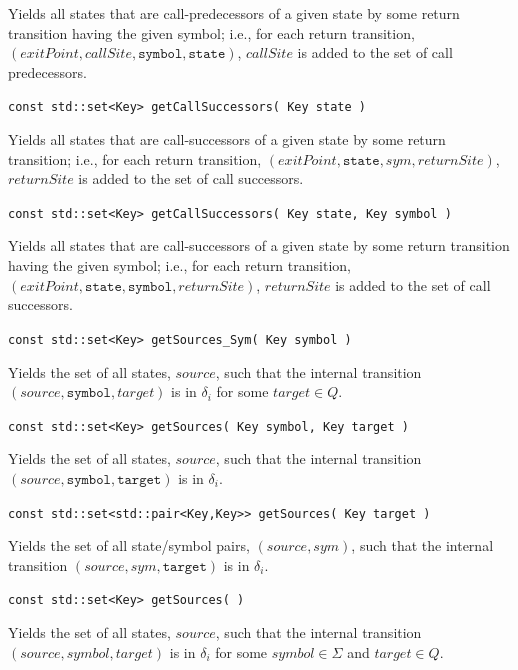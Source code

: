 \documentclass{llncs}
\begin{document}
\begin{description}
    Yields all states that are call-predecessors of a given state by some
    return transition having the given symbol; i.e., for each return
    transition, $(exitPoint,callSite,\texttt{symbol},\texttt{state})$,
    $callSite$ is added to the set of call predecessors.

  \item\texttt{const std::set<Key> getCallSuccessors( Key state )} \nopagebreak

    Yields all states that are call-successors of a given state by some
    return transition; i.e., for each return transition,
    $(exitPoint,\texttt{state},sym,returnSite)$, $returnSite$ is added to the
    set of call successors.

  \item\texttt{const std::set<Key> getCallSuccessors( Key state, Key symbol )} \nopagebreak

    Yields all states that are call-successors of a given state by some
    return transition having the given symbol; i.e., for each return
    transition, $(exitPoint,\texttt{state},\texttt{symbol},returnSite)$,
    $returnSite$ is added to the set of call successors.

  \item\texttt{const std::set<Key> getSources\_Sym( Key symbol )} \nopagebreak

    Yields the set of all states, $source$, such that the internal transition
    $(source,\texttt{symbol},target)$ is in $\delta_i$ for some $target \in
    Q$.

  \item\texttt{const std::set<Key> getSources( Key symbol, Key target )} \nopagebreak

    Yields the set of all states, $source$, such that the internal transition
    $(source,\texttt{symbol},\texttt{target})$ is in $\delta_i$.

  \item\texttt{const std::set<std::pair<Key,Key>> getSources( Key target )} \nopagebreak

    Yields the set of all state/symbol pairs, $(source,sym)$, such that the
    internal transition $(source,sym,\texttt{target})$ is in $\delta_i$.

  \item\texttt{const std::set<Key> getSources( )} \nopagebreak

    Yields the set of all states, $source$, such that the internal transition
    $(source,symbol,target)$ is in $\delta_i$ for some $symbol \in \Sigma$
    and $target \in Q$.


\end{description}
\end{document}

